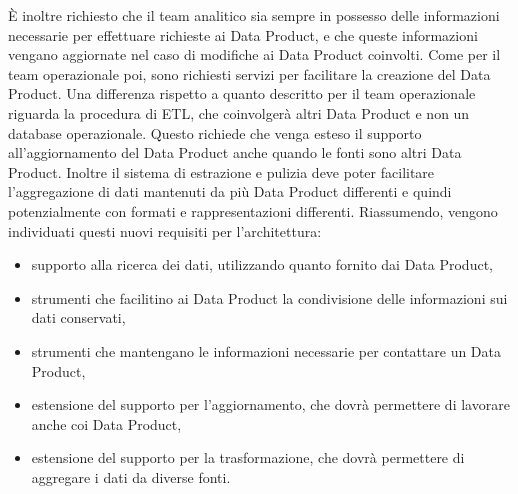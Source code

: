 \documentclass[12pt]{report}
\begin{document}
È inoltre richiesto che il team analitico sia sempre in possesso delle informazioni necessarie per effettuare richieste ai Data Product, e che queste informazioni vengano aggiornate nel caso di modifiche ai Data Product coinvolti.
Come per il team operazionale poi, sono richiesti servizi per facilitare la creazione del Data Product. 
Una differenza rispetto a quanto descritto per il team operazionale riguarda la procedura di ETL, che coinvolgerà altri Data Product e non un database operazionale.
Questo richiede che venga esteso il supporto all'aggiornamento del Data Product anche quando le fonti sono altri Data Product. 
Inoltre il sistema di estrazione e pulizia deve poter facilitare l'aggregazione di dati mantenuti da più Data Product differenti e quindi potenzialmente con formati e rappresentazioni differenti.
Riassumendo, vengono individuati questi nuovi requisiti per l'architettura: 
\begin{itemize}
    \item supporto alla ricerca dei dati, utilizzando quanto fornito dai Data Product,
    \item strumenti che facilitino ai Data Product la condivisione delle informazioni sui dati conservati,
    \item strumenti che mantengano le informazioni necessarie per contattare un Data Product,
    \item estensione del supporto per l'aggiornamento, che dovrà permettere di lavorare anche coi Data Product,
    \item estensione del supporto per la trasformazione, che dovrà permettere  di aggregare i dati da diverse fonti.
\end{itemize}
\end{document}
